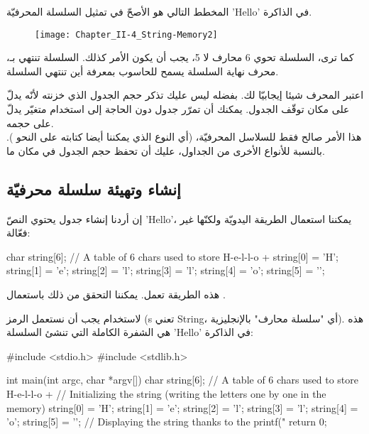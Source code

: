 المخطط التالي هو الأصحّ في تمثيل السلسلة المحرفيّة
'\textenglish{Hello}'
في الذاكرة.

\begin{figure}[H]
	\centering
	\texttt{[image: Chapter\_II-4\_String-Memory2]}
\end{figure}

كما ترى، السلسلة تحوي 6 محارف لا 5، يجب أن يكون الأمر كذلك. السلسلة تنتهي بـ،
محرف نهاية السلسلة يسمح للحاسوب بمعرفة أين تنتهي السلسلة.

اعتبر المحرف
شيئا إيجابيّا لك. بفضله ليس عليك تذكر حجم الجدول الذي خزنته لأنّه يدلّ على مكان توقّف الجدول. يمكنك أن تمرّر جدول
دون الحاجة إلى استخدام متغيّر يدلّ على حجمه.\\
هذا الأمر صالح فقط للسلاسل المحرفيّة، (أي النوع
الذي يمكننا أيضا كتابته على النحو
).
بالنسبة للأنواع الأخرى من الجداول، عليك أن تحفظ حجم الجدول في مكان ما.

\subsection{إنشاء وتهيئة سلسلة محرفيّة}

إن أردنا إنشاء جدول
يحتوي النصّ
'\textenglish{Hello}'،
يمكننا استعمال الطريقة اليدويّة ولكنّها غير فعّالة:

\begin{Csource}
char string[6]; // A table of  6 chars used to store H-e-l-l-o + \0
string[0] = 'H';
string[1] = 'e';
string[2] = 'l';
string[3] = 'l';
string[4] = 'o';
string[5] = '\0';
\end{Csource}

هذه الطريقة تعمل. يمكننا التحقق من ذلك باستعمال
.

لاستخدام
يجب أن نستعمل الرمز
(\textenglish{s}
تعني
\textenglish{String}،
أي "سلسلة محارف" بالإنجليزية). هذه هي الشفرة الكاملة التي تنشئ السلسلة
'\textenglish{Hello}'
في الذاكرة:

\begin{Csource}
#include <stdio.h>
#include <stdlib.h>

int main(int argc, char *argv[])
{
	char string[6]; // A table of 6 chars used to store H-e-l-l-o + \0
	// Initializing the string (writing the letters one by one in the memory)
	string[0] = 'H';
	string[1] = 'e';
	string[2] = 'l';
	string[3] = 'l';
	string[4] = 'o';
	string[5] = '\0';
	// Displaying the string thanks to the %
	printf("%
	return 0;
}
\end{Csource}

